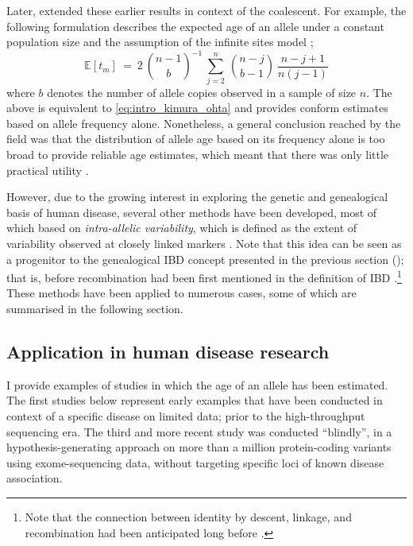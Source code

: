 Later, \citet{Griffiths:2013ec} extended these earlier results in context of the coalescent.
For example, the following formulation describes the expected age of an allele under a constant population size and the assumption of the infinite sites model \citep{Kimura:1969tn,Watterson:1975ur};
\begin{equation}\label{eq:intro_griffiths_tavare}
	\mathbb{E}\left[t_m\right]~=~2~{{n-1}\choose{b}}^{-1}~\sum_{j=2}^{n}~{{n-j}\choose{b-1}}~\frac{n-j+1}{n(j-1)}
\end{equation}
where $b$ denotes the number of allele copies observed in a sample of size $n$.
The above is equivalent to \cref{eq:intro_kimura_ohta} and provides conform estimates based on allele frequency alone.
Nonetheless, a general conclusion reached by the field was that the distribution of allele age based on its frequency alone is too broad to provide reliable age estimates, which meant that there was only little practical utility \citep[see][]{Slatkin:2000bi}.

However, due to the growing interest in exploring the genetic and genealogical basis of human disease, several other methods have been developed, most of which based on \emph{intra-allelic variability}, which is defined as the extent of variability observed at closely linked markers \citep{Slatkin:2000us,Slatkin:2001wr}.
Note that this idea can be seen as a progenitor to the genealogical IBD concept presented in the previous section (); that is, before recombination had been first mentioned in the definition of IBD \citep{Hayes:2003gj}.\footnote{Note that the connection between identity by descent, linkage, and recombination had been anticipated long before \citep[\eg see][]{Donnelly:1983fi}.}
These methods have been applied to numerous cases, some of which are summarised in the following section.


%
\subsection{Application in human disease research}
%

I provide  examples of studies in which the age of an allele has been estimated.
The first  studies below represent early examples that have been conducted in context of a specific disease on limited data; \ie prior to the high-throughput sequencing era.
The third and more recent study was conducted ``blindly'', in a hypothesis-generating approach on more than a million protein-coding variants using exome-sequencing data, without targeting specific loci of known disease association.

